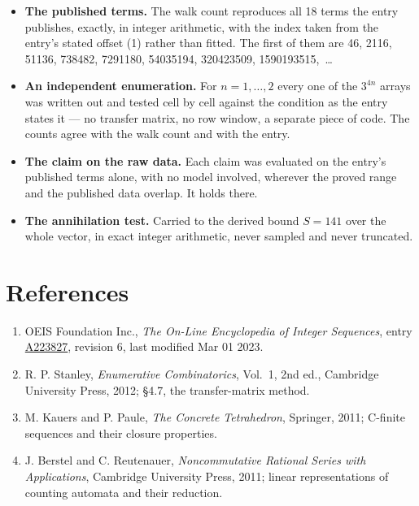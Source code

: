 \documentclass[11pt]{article}
\theoremstyle{definition}
\begin{document}
\begin{itemize}

\item {\bfseries The published terms.} The walk count reproduces all 18 terms the entry publishes, exactly, in integer arithmetic, with the index taken from the entry's stated offset (1) rather than fitted. The first of them are 46, 2116, 51136, 738482, 7291180, 54035194, 320423509, 1590193515,~\dots

\item {\bfseries An independent enumeration.} For $n = 1,\dots,2$ every one of the $3^{4n}$ arrays was written out and tested cell by cell against the condition as the entry states it --- no transfer matrix, no row window, a separate piece of code. The counts agree with the walk count and with the entry.

\item {\bfseries The claim on the raw data.} Each claim was evaluated on the entry's published terms alone, with no model involved, wherever the proved range and the published data overlap. It holds there.

\item {\bfseries The annihilation test.} Carried to the derived bound $S = 141$ over the whole vector, in exact integer arithmetic, never sampled and never truncated.

\end{itemize}

\section{References}

\begin{enumerate}

\item OEIS Foundation Inc., \emph{The On-Line Encyclopedia of Integer Sequences}, entry \href{https://oeis.org/A223827}{A223827}, revision 6, last modified Mar 01 2023.

\item R. P. Stanley, \emph{Enumerative Combinatorics}, Vol.~1, 2nd ed., Cambridge University Press, 2012; \S4.7, the transfer-matrix method.

\item M. Kauers and P. Paule, \emph{The Concrete Tetrahedron}, Springer, 2011; C-finite sequences and their closure properties.

\item J. Berstel and C. Reutenauer, \emph{Noncommutative Rational Series with Applications}, Cambridge University Press, 2011; linear representations of counting automata and their reduction.

\end{enumerate}
\end{document}
